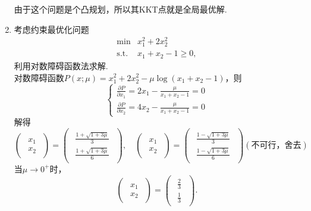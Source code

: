 \begin{enumerate}
\begin{enumerate}[label=(\arabic*)]
    \end{enumerate}
    由于这个问题是个凸规划，所以其KKT点就是全局最优解.
    \item 考虑约束最优化问题
    \[\begin{array}{lll}
        \min & x_1^2+2x_2^2\\
        \mathrm{s.t.} & x_1+x_2-1 \geqslant 0,
    \end{array}\]
    利用对数障碍函数法求解.\\
    \sol 对数障碍函数$P(x;\mu)=x_1^2+2x_2^2-\mu\log(x_1+x_2-1)$，则
    \[\begin{cases}
        \displaystyle \frac{\partial P}{\partial x_1}=2x_1-\frac{\mu}{x_1+x_2-1}=0\\
        \displaystyle \frac{\partial P}{\partial x_2}=4x_2-\frac{\mu}{x_1+x_2-1}=0
    \end{cases}\]
    解得
    \[\left(\begin{array}{cc}
        \begin{matrix}
            x_1 \\ x_2
        \end{matrix}
    \end{array}\right)=\left(\begin{array}{cc}
        \begin{matrix}
            \displaystyle \frac{1+\sqrt{1+3\mu}}{3} \\ \displaystyle \frac{1+\sqrt{1+3\mu}}{6}
        \end{matrix}
    \end{array}\right),\quad\left(\begin{array}{cc}
        \begin{matrix}
            x_1 \\ x_2
        \end{matrix}
    \end{array}\right)=\left(\begin{array}{cc}
        \begin{matrix}
            \displaystyle \frac{1-\sqrt{1+3\mu}}{3} \\ \displaystyle \frac{1-\sqrt{1+3\mu}}{6}
        \end{matrix}
    \end{array}\right)(\text{不可行，舍去})\]
    当$\mu \to 0^+$时，\[\left(\begin{array}{cc}
        \begin{matrix}
            x_1 \\ x_2
        \end{matrix}
    \end{array}\right)=\left(\begin{array}{cc}
        \begin{matrix}
            \displaystyle \frac{2}{3} \\ \displaystyle \frac{1}{3}
        \end{matrix}
    \end{array}\right).\]
\end{enumerate}